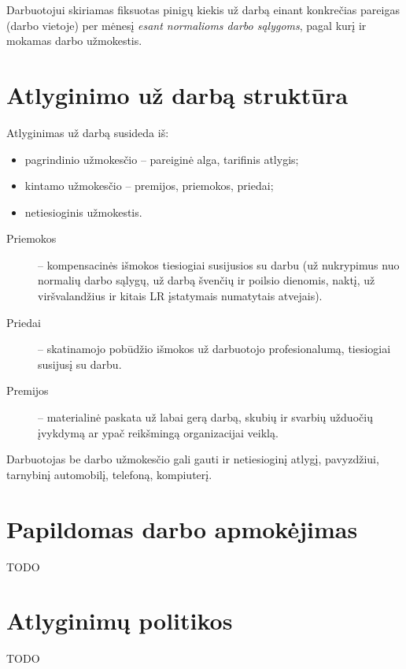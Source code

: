\begin{defn}
  Darbuotojui skiriamas fiksuotas pinigų kiekis už darbą einant konkrečias
  pareigas (darbo vietoje) per mėnesį \emph{esant normalioms darbo
  sąlygoms}, pagal kurį ir mokamas darbo užmokestis.
\end{defn}

\section{Atlyginimo už darbą struktūra}

Atlyginimas už darbą susideda iš:
\begin{itemize}
  \item pagrindinio užmokesčio – pareiginė alga, tarifinis atlygis;
  \item kintamo užmokesčio – premijos, priemokos, priedai;
  \item netiesioginis užmokestis.
\end{itemize}

\begin{description}
  \item[Priemokos] – kompensacinės išmokos tiesiogiai susijusios su darbu
    (už nukrypimus nuo normalių darbo sąlygų, už darbą švenčių ir
    poilsio dienomis, naktį, už viršvalandžius ir kitais LR įstatymais
    numatytais atvejais).
  \item[Priedai] – skatinamojo pobūdžio išmokos už darbuotojo
    profesionalumą, tiesiogiai susijusį su darbu.
  \item[Premijos] – materialinė paskata už labai gerą darbą, skubių ir
    svarbių užduočių įvykdymą ar ypač reikšmingą organizacijai veiklą.
\end{description}

Darbuotojas be darbo užmokesčio gali gauti ir netiesioginį atlygį,
pavyzdžiui, tarnybinį automobilį, telefoną, kompiuterį.

\section{Papildomas darbo apmokėjimas}

TODO

\section{Atlyginimų politikos}

TODO

